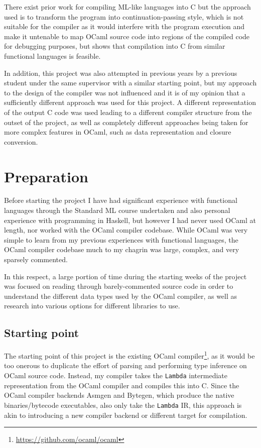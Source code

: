 There exist prior work for compiling ML-like languages into C
\cite{noassemblyrequired} but the approach used is to transform the program into
continuation-passing style, which is not suitable for the compiler as it would
interfere with the program execution and make it untenable to map OCaml source
code into regions of the compiled code for debugging purposes, but shows that
compilation into C from similar functional languages is feasible.

In addition, this project was also attempted in previous years by a previous
student \cite{previousproject} under the same supervisor with a similar starting
point, but my approach to the design of the compiler was not influenced and it
is of my opinion that a sufficiently different approach was used for this
project. A different representation of the output C code was used leading to a
different compiler structure from the outset of the project, as well as
completely different approaches being taken for more complex features in OCaml,
such as data representation and closure conversion.

\chapter{Preparation}

Before starting the project I have had significant experience with functional
languages through the Standard ML course undertaken and also personal experience
with programming in Haskell, but however I had never used OCaml at length, nor
worked with the OCaml compiler codebase. While OCaml was very simple to learn
from my previous experiences with functional languages, the OCaml compiler
codebase much to my chagrin was large, complex, and very sparsely commented.

In this respect, a large portion of time during the starting weeks of the 
project was focused on reading through barely-commented source code in order to
understand the different data types used by the OCaml compiler, as well as
research into various options for different libraries to use.

\section{Starting point}

The starting point of this project is the existing OCaml
compiler\footnote{\url{https://github.com/ocaml/ocaml}}, as it would be too
onerous to duplicate the effort of parsing and performing type inference on
OCaml source code. Instead, my compiler takes the \texttt{Lambda} intermediate
representation from the OCaml compiler and compiles this into C. Since the OCaml
compiler backends Asmgen and Bytegen, which produce the native binaries/bytecode
executables, also only take the \texttt{Lambda} IR, this approach is akin to
introducing a new compiler backend or different target for compilation.

